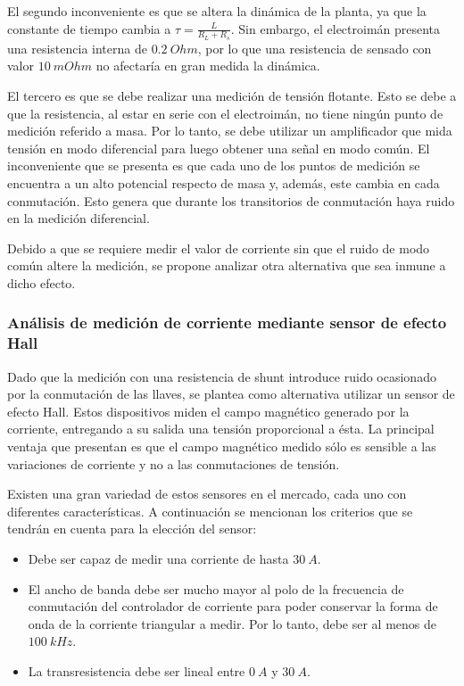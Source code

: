 El segundo inconveniente es que se altera la dinámica de la planta, ya que la constante de tiempo cambia a $\tau=\frac{L}{R_L+R_s}$. Sin embargo, el electroimán presenta una resistencia interna de $0.2\:Ohm$, por lo que una resistencia de sensado con valor $10\:mOhm$ no afectaría en gran medida la dinámica.

El tercero es que se debe realizar una medición de tensión flotante. Esto se debe a que la resistencia, al estar en serie con el electroimán, no tiene ningún punto de medición referido a masa. Por lo tanto, se debe utilizar un amplificador que mida tensión en modo diferencial para luego obtener una señal en modo común. El inconveniente que se presenta es que cada uno de los puntos de medición se encuentra a un alto potencial respecto de masa y, además, este cambia en cada conmutación. Esto genera que durante los transitorios de conmutación haya ruido en la medición diferencial.

Debido a que se requiere medir el valor de corriente sin que el ruido de modo común altere la medición, se propone analizar otra alternativa que sea inmune a dicho efecto.


\subsubsection{Análisis de medición de corriente mediante sensor de efecto Hall}

Dado que la medición con una resistencia de shunt introduce ruido ocasionado por la conmutación de las llaves, se plantea como alternativa utilizar un sensor de efecto Hall. Estos dispositivos miden el campo magnético generado por la corriente, entregando a su salida una tensión proporcional a ésta. La principal ventaja que presentan es que el campo magnético medido sólo es sensible a las variaciones de corriente y no a las conmutaciones de tensión.

Existen una gran variedad de estos sensores en el mercado, cada uno con diferentes características. A continuación se mencionan los criterios que se tendrán en cuenta para la elección del sensor:

\begin{itemize}
	\item Debe ser capaz de medir una corriente de hasta $30\:A$.
	\item El ancho de banda debe ser mucho mayor al polo de la frecuencia de conmutación del controlador de corriente para poder conservar la forma de onda de la corriente triangular a medir. Por lo tanto, debe ser al menos de $100\:kHz$.
	\item La transresistencia debe ser lineal entre $0\:A$ y $30\:A$.	
\end{itemize}

